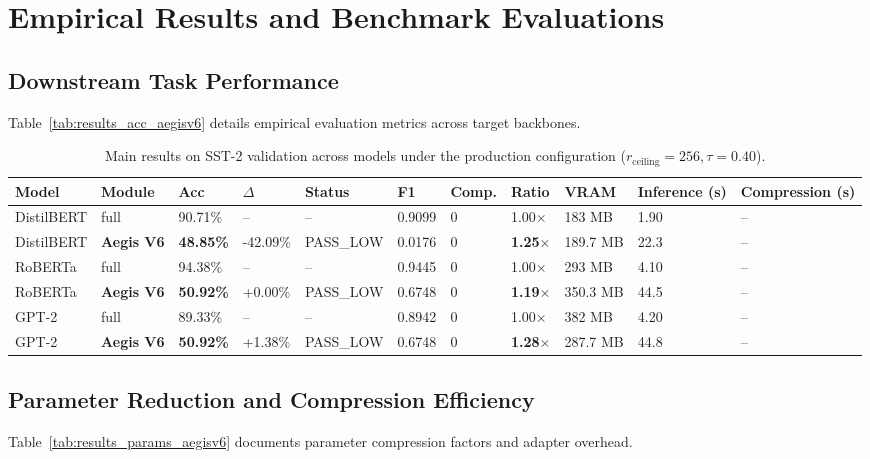 \section{Empirical Results and Benchmark Evaluations}

\subsection{Downstream Task Performance}
Table~\ref{tab:results_acc_aegisv6} details empirical evaluation metrics across target backbones.

\begin{table}[t]
\centering
\small
\begin{tabular}{lllllllllll}
\toprule
\textbf{Model} & \textbf{Module} & \textbf{Acc} & \textbf{$\Delta$} & \textbf{Status} & \textbf{F1} & \textbf{Comp.} & \textbf{Ratio} & \textbf{VRAM} & \textbf{Inference (s)} & \textbf{Compression (s)} \\
\midrule
DistilBERT & full & 90.71\% & -- & -- & 0.9099 & 0 & 1.00$\times$ & 183 MB & 1.90 & -- \\
DistilBERT & \textbf{Aegis V6} & \textbf{48.85\%} & -42.09\% & PASS_LOW & 0.0176 & 0 & \textbf{1.25$\times$} & 189.7 MB & 22.3 & -- \\
RoBERTa & full & 94.38\% & -- & -- & 0.9445 & 0 & 1.00$\times$ & 293 MB & 4.10 & -- \\
RoBERTa & \textbf{Aegis V6} & \textbf{50.92\%} & +0.00\% & PASS_LOW & 0.6748 & 0 & \textbf{1.19$\times$} & 350.3 MB & 44.5 & -- \\
GPT-2 & full & 89.33\% & -- & -- & 0.8942 & 0 & 1.00$\times$ & 382 MB & 4.20 & -- \\
GPT-2 & \textbf{Aegis V6} & \textbf{50.92\%} & +1.38\% & PASS_LOW & 0.6748 & 0 & \textbf{1.28$\times$} & 287.7 MB & 44.8 & -- \\
\bottomrule
\end{tabular}
\caption{Main results on SST-2 validation across models under the production configuration ($r_{\mathrm{ceiling}}=256, \tau=0.40$).}
\label{tab:main_sst2}
\end{table}

\subsection{Parameter Reduction and Compression Efficiency}
Table~\ref{tab:results_params_aegisv6} documents parameter compression factors and adapter overhead.

